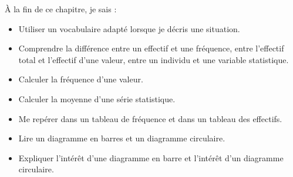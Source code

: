 \begin{objectifs}
À la fin de ce chapitre, je sais :
\begin{itemize}[label=\textbullet]
    \item Utiliser un vocabulaire adapté lorsque je décris une situation.
    \item Comprendre la différence entre un effectif et une fréquence, entre
        l'effectif total et l'effectif d'une valeur, entre un individu et une
        variable statistique.
    \item Calculer la fréquence d'une valeur.
    \item Calculer la moyenne d'une série statistique.
    \item Me repérer dans un tableau de fréquence et dans un tableau des
        effectifs.
    \item Lire un diagramme en barres et un diagramme circulaire.
    \item Expliquer l'intérêt d'une diagramme en barre et l'intérêt d'un diagramme
        circulaire.
\end{itemize}
\end{objectifs}



